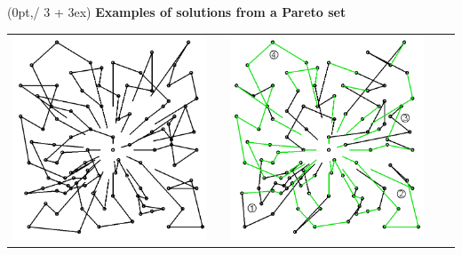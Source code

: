 \newcommand\twolines[2]{\vbox{\hbox{#1}\vskip.5em\hbox{#2}}}
\begin{textblock*}{\posterboxwidth}(0pt,\posterboxheight / 3 + 3ex)%
\centering%
\textbf{Examples of solutions from a Pareto set}\\[1ex]
\begin{tabular}{ccccc}
\includegraphics[height=\posterboxheight / 4]{bitmap/R102_2_Solutions_1} & \hspace{2ex} &
\includegraphics[height=\posterboxheight / 4]{bitmap/R102_2_Solutions_2} & \hspace{2ex} &

\end{tabular}
\end{textblock*}
